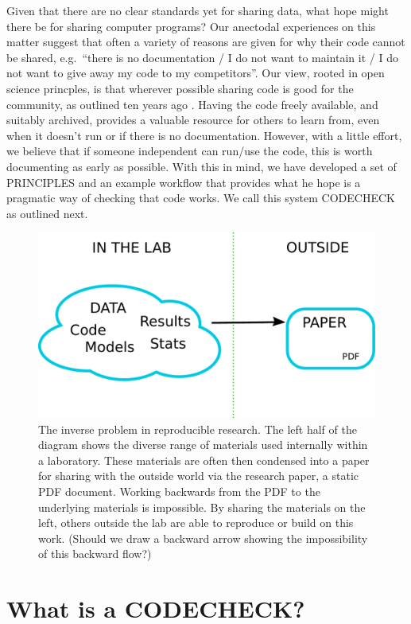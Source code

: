 \documentclass[12pt]{article}
\begin{document}
Given that there are no clear standards yet for sharing data, what hope
might there be for sharing computer programs? Our anectodal experiences
on this matter suggest that often a variety of reasons are given for why
their code cannot be shared, e.g.~``there is no documentation / I do not
want to maintain it / I do not want to give away my code to my
competitors''. Our view, rooted in open science princples, is that
wherever possible sharing code is good for the community, as outlined
ten years ago \cite{Barnes2010-iv}. Having the code freely available, and
suitably archived, provides a valuable resource for others to learn
from, even when it doesn't run or if there is no documentation. However,
with a little effort, we believe that if someone independent can run/use
the code, this is worth documenting as early as possible. With this in
mind, we have developed a set of PRINCIPLES and an example workflow that
provides what he hope is a pragmatic way of checking that code works. We
call this system CODECHECK as outlined next.

\begin{figure}
  \centering
  \includegraphics[width=\textwidth]{figs/rr.pdf}
  \caption{The inverse problem in reproducible research.  The left
  half of the diagram shows the diverse range of materials used
  internally within a laboratory.  These materials are often then
  condensed into a paper for sharing with the outside world via the
  research paper, a static PDF document.  Working backwards from the
  PDF to the underlying materials is impossible.  By sharing the
  materials on the left, others outside the lab are able to reproduce
  or build on this work.  (Should we draw a backward arrow showing the
  impossibility of this backward flow?)}
  \label{fig:inverse}
\end{figure}

\section*{What is a CODECHECK?}\label{what-is-a-codecheck}
\end{document}
